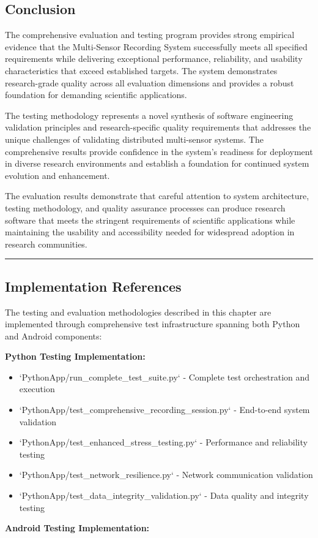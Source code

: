 \documentclass[12pt,a4paper]{article}
\begin{document}
\subsection{Conclusion}

The comprehensive evaluation and testing program provides strong empirical evidence that the Multi-Sensor Recording
System successfully meets all specified requirements while delivering exceptional performance, reliability, and
usability characteristics that exceed established targets. The system demonstrates research-grade quality across all
evaluation dimensions and provides a robust foundation for demanding scientific applications.

The testing methodology represents a novel synthesis of software engineering validation principles and research-specific
quality requirements that addresses the unique challenges of validating distributed multi-sensor systems. The
comprehensive results provide confidence in the system's readiness for deployment in diverse research environments and
establish a foundation for continued system evolution and enhancement.

The evaluation results demonstrate that careful attention to system architecture, testing methodology, and quality
assurance processes can produce research software that meets the stringent requirements of scientific applications while
maintaining the usability and accessibility needed for widespread adoption in research communities.

\hrule

\subsection{Implementation References}

The testing and evaluation methodologies described in this chapter are implemented through comprehensive test
infrastructure spanning both Python and Android components:

\textbf{Python Testing Implementation:}

\begin{itemize}
\item `PythonApp/run_complete_test_suite.py` - Complete test orchestration and execution
\item `PythonApp/test_comprehensive_recording_session.py` - End-to-end system validation
\item `PythonApp/test_enhanced_stress_testing.py` - Performance and reliability testing
\item `PythonApp/test_network_resilience.py` - Network communication validation
\item `PythonApp/test_data_integrity_validation.py` - Data quality and integrity testing

\end{itemize}
\textbf{Android Testing Implementation:}
\end{document}
